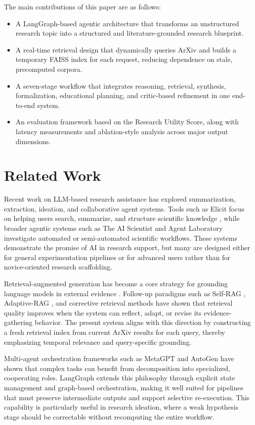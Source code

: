 \documentclass[conference]{IEEEtran}
\begin{document}
The main contributions of this paper are as follows:
\begin{itemize}
\item A LangGraph-based agentic architecture that transforms an unstructured research topic into a structured and literature-grounded research blueprint.
\item A real-time retrieval design that dynamically queries ArXiv and builds a temporary FAISS index for each request, reducing dependence on stale, precomputed corpora.
\item A seven-stage workflow that integrates reasoning, retrieval, synthesis, formalization, educational planning, and critic-based refinement in one end-to-end system.
\item An evaluation framework based on the Research Utility Score, along with latency measurements and ablation-style analysis across major output dimensions.
\end{itemize}

\section{Related Work}
Recent work on LLM-based research assistance has explored summarization, extraction, ideation, and collaborative agent systems. Tools such as Elicit focus on helping users search, summarize, and structure scientific knowledge \cite{stiennon2022elicit}, while broader agentic systems such as The AI Scientist \cite{lu2024aiscientist} and Agent Laboratory \cite{lal2024agentlab} investigate automated or semi-automated scientific workflows. These systems demonstrate the promise of AI in research support, but many are designed either for general experimentation pipelines or for advanced users rather than for novice-oriented research scaffolding.

Retrieval-augmented generation has become a core strategy for grounding language models in external evidence \cite{lewis2020rag}. Follow-up paradigms such as Self-RAG \cite{asai2024selfrag}, Adaptive-RAG \cite{jeong2024adaptiverag}, and corrective retrieval methods have shown that retrieval quality improves when the system can reflect, adapt, or revise its evidence-gathering behavior. The present system aligns with this direction by constructing a fresh retrieval index from current ArXiv results for each query, thereby emphasizing temporal relevance and query-specific grounding.

Multi-agent orchestration frameworks such as MetaGPT \cite{hong2024metagpt} and AutoGen \cite{wu2023autogen} have shown that complex tasks can benefit from decomposition into specialized, cooperating roles. LangGraph extends this philosophy through explicit state management and graph-based orchestration, making it well suited for pipelines that must preserve intermediate outputs and support selective re-execution. This capability is particularly useful in research ideation, where a weak hypothesis stage should be correctable without recomputing the entire workflow.
\end{document}
